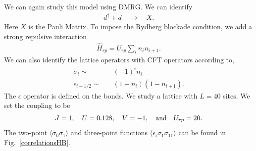 \documentclass[prb,twocolumn,11pt]{revtex4-1}
\begin{document}
We can again study this model using DMRG. We can identify 
\begin{align}
    d^{\dagger}+d \quad \rightarrow  \quad X.
\end{align}
Here $X$ is the Pauli Matrix. 
To impose the Rydberg blockade condition, we add a strong repulsive interaction 
\begin{align}
    \hat{H}_{rp}=U_{rp} \sum_i n_i n_{i+1}.
\end{align}
We can also identify the lattice operators with CFT operators according to,
\begin{align}   
    \sigma_i \sim &\quad  (-1)^i n_i \nonumber\\
    \epsilon_{i+1/2} \sim & \quad (1-n_{i})(1-n_{i+1}).
\end{align}
The $\epsilon$ operator is defined on the bonds. 
We study a lattice with $L=40$ sites. We set the coupling to be 
\begin{align}
    J=1,\quad U=0.128, \quad V=-1, \quad {\rm and}\quad U_{rp}=20.
\end{align}
The two-point $\langle\sigma_0 \sigma_1\rangle$ and three-point functions  $\langle \epsilon_i \sigma_1 \sigma_{11}\rangle$ can be found in Fig.~\ref{correlationsHB}.
\end{document}

